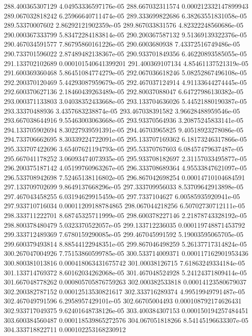 {288.400365307129 4.04953336597176e-05
288.667032311574 0.000212332147899943
289.067032818242 6.25966640711474e-05
289.333699822686 6.38263551831058e-05
289.53370007602 2.86292121902359e-05
289.867033831576 4.82322248560686e-05
290.000367333799 5.83472284183814e-05
290.200367587132 9.51369139322376e-05
290.467034591577 7.86795860161226e-05
290.6003680938 7.43372516749486e-05
290.733701596022 2.87489482138367e-05
290.933701849356 6.46220893585055e-05
291.133702102689 0.000101540641399201
291.400369107134 4.85461137521319e-05
291.600369360468 5.86451084774279e-05
292.067036618246 5.08252867496108e-05
292.200370120469 5.44293087959679e-05
292.467037124914 4.91133644274445e-05
292.600370627136 2.18460439263489e-05
292.80037088047 6.64727986130382e-05
293.000371133803 3.04038352433668e-05
293.133704636026 5.44521880190387e-05
293.33370488936 3.4357683238874e-05
293.467038391582 3.96628488959546e-05
293.667038644916 9.55463003063668e-05
293.93370564936 3.20875245833141e-05
294.133705902694 8.30227939591391e-05
294.46703965825 9.40518923278086e-05
294.733706662695 8.30339224722091e-05
295.133707169362 6.18173246317866e-05
295.333707422696 3.65407621194793e-05
295.53370767603 6.08457479637487e-05
295.667041178252 3.06093474073935e-05
295.933708182697 2.31157033495877e-05
296.200375187142 4.05199760963267e-05
296.333708689364 4.95533847621097e-05
296.533708942698 7.52465138116802e-05
296.867042698254 0.00014710104684591
297.133709702699 9.8649137668296e-05
297.333709956033 8.53709642913898e-05
297.467043458255 6.03194629915459e-05
297.7337104627 6.00585935920941e-05
297.933710716034 0.00011209188784865
298.067044218256 6.50702730712111e-05
298.333711222701 8.68745325711999e-05
298.600378227146 2.21878743328192e-05
298.800378480479 5.0323370522057e-05
299.133712236035 0.000119748871453792
299.333712489369 7.6780159290085e-05
299.467045991592 5.19003595065705e-05
299.600379493814 8.88544122948351e-05
299.867046498259 5.26137717314824e-05
300.267047004926 7.75153860599785e-05
300.533714009371 0.000117162901953436
300.800381013816 0.000418063431675742
301.00038126715 7.61863249334184e-05
301.133714769372 8.60162034262068e-05
301.467048524928 5.24124371809414e-05
301.667048778262 0.000805705876759263
302.000382533818 0.00014123580679037
302.200382787152 0.00012513530821617
302.333716289374 4.99519949791487e-05
302.467049791596 6.2958957429101e-05
302.66705004493 0.000108792174626431
302.933717049375 9.62401648738126e-05
303.400384307153 0.000150194257484451
303.600384560487 0.000118539865272576
304.067051818266 8.54145196633307e-05
304.333718822711 0.000102253168230912
}
